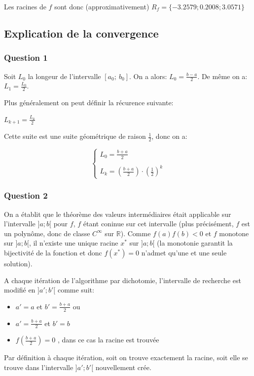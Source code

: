 \documentclass{article}
\begin{document}
	Les racines de $f$ sont donc (approximativement)
	$R_{f}=\{-3.2579 ; 0.2008 ; 3.0571\}$
	
	\newpage	
	
	\subsection{Explication de la convergence}
	
	\subsubsection{Question 1}
	
	Soit $L_{0}$ la longeur de l'intervalle $[a_{0};\:b_{0}]$. On a alors:
	$L_{0}=\frac{b-a}{2}$.
	De même on a: $L_{1}=\frac{L_{0}}{2}$.
	
	Plus généralement on peut définir la récurence suivante:
	
	\begin{center}
		\begin{large}
			$L_{k+1}=\frac{L_{k}}{2}$
		\end{large}
	\end{center}
	
	Cette suite est une suite géométrique de raison $\frac{1}{2}$, donc on a:
	\begin{large}
		$$
		\left\{
			\begin{array}{ll}
				L_{0} = \frac{b+a}{2} \\ \\
				L_{k} = (\frac{b+a}{2}) \cdot (\frac{1}{2})^{k}
			\end{array}
		\right.
		$$
	\end{large}
	
	\subsubsection{Question 2}
	
	On a établit que le théorème des valeurs intermédiaires était applicable sur l'intervalle $]a; b[$ pour $f$, $f$ étant coninue sur cet intervalle (plus précisément, $f$ est un polynôme, donc de classe $C^{\infty}$ sur $\mathbb{R}$). Comme $f(a)f(b)<0$ et $f$ monotone sur $]a; b[$, il n'existe une unique racine $x^{*}$ sur $]a; b[$ (la monotonie garantit la bijectivité de la fonction et donc $f(x^{*})=0$ n'admet qu'une et une seule solution).
	
	A chaque itération de l'algorithme par dichotomie,
	l'intervalle de recherche est modifié en $]a';b'[$ comme suit:
	\begin{itemize}
		\item $a'=a$ et $b'=\frac{b+a}{2}$ ou
		\item $a'=\frac{b+a}{2}$ et $b'=b$
		\item $f(\frac{b+a}{2})=0$ , dans ce cas la racine est trouvée
	\end{itemize}
	Par définition à chaque itération, soit on trouve exactement la racine, soit elle se trouve dans l'intervalle $]a'; b'[$ nouvellement crée.
	
\end{document}
